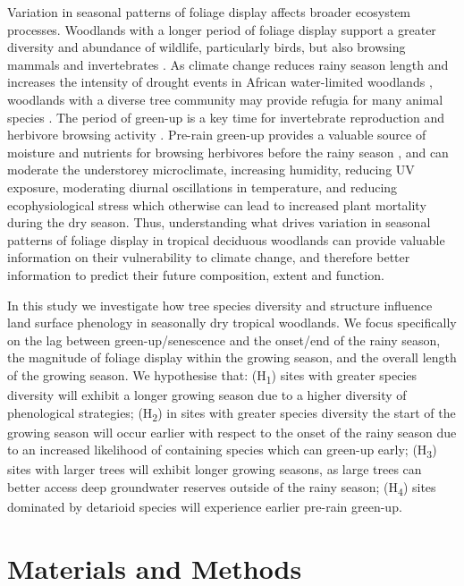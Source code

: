 \documentclass[11pt,a4paper]{article}
\begin{document}
Variation in seasonal patterns of foliage display affects broader ecosystem
processes. Woodlands with a longer period of foliage display support a greater
diversity and abundance of wildlife, particularly birds, but also browsing
mammals and invertebrates \citep{Cole2015, Araujo2017, Morellato2016,
Ogutu2013}. As climate change reduces rainy season length and increases the
intensity of drought events in African water-limited woodlands \citep{Cook2020,
Gore2019}, woodlands with a diverse tree community may provide refugia for many
animal species \citep{Bale2002}. The period of green-up is a key time for
invertebrate reproduction \citep{Prather2012} and herbivore browsing activity
\citep{Velasque2016, Morellato2016}. Pre-rain green-up provides a valuable
source of moisture and nutrients for browsing herbivores before the rainy
season \citep{Makhado2018}, and can moderate the understorey microclimate,
increasing humidity, reducing UV exposure, moderating diurnal oscillations in
temperature, and reducing ecophysiological stress which otherwise can lead to
increased plant mortality during the dry season. Thus, understanding what
drives variation in seasonal patterns of foliage display in tropical deciduous
woodlands can provide valuable information on their vulnerability to climate
change, and therefore better information to predict their future composition,
extent and function.

In this study we investigate how tree species diversity and structure influence
land surface phenology in seasonally dry tropical woodlands. We focus
specifically on the lag between green-up/senescence and the onset/end of the
rainy season, the magnitude of foliage display within the growing season, and
the overall length of the growing season. We hypothesise that:
(H\textsubscript{1}) sites with greater species diversity will exhibit a longer
growing season due to a higher diversity of phenological strategies;
(H\textsubscript{2}) in sites with greater species diversity the start of the
growing season will occur earlier with respect to the onset of the rainy season
due to an increased likelihood of containing species which can green-up early;
(H\textsubscript{3}) sites with larger trees will exhibit longer growing
seasons, as large trees can better access deep groundwater reserves outside of
the rainy season; (H\textsubscript{4}) sites dominated by detarioid species
will experience earlier pre-rain green-up. 

\section{Materials and Methods}
\end{document}
